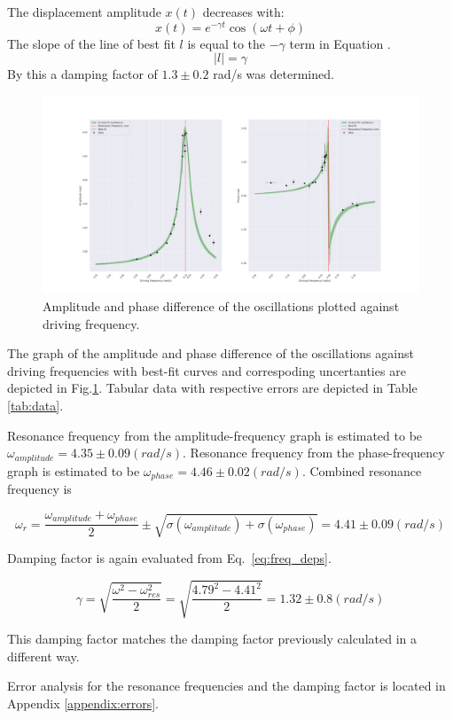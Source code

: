 The displacement amplitude $x(t)$ decreases with:
\begin{equation}
  x(t) = e^{-\gamma t} \cos(\omega t + \phi) 
\end{equation}
The slope of the line of best fit $l$ is equal to the $-\gamma$ term in Equation .
\begin{equation}
  |l| = \gamma 
\end{equation}
By this a damping factor of $1.3 ± 0.2$ rad/s was determined.



\begin{figure}[H]
  \centering
  \includegraphics[width=1\textwidth]{oscillations/images/resonance}
  \caption{Amplitude and phase difference of the oscillations plotted against driving frequency.}
  \label{fig:resonance}
\end{figure}

The graph of the amplitude and phase difference of the oscillations against driving frequencies with best-fit curves and correspoding uncertanties are depicted in Fig.\ref{fig:resonance}. Tabular data with respective errors are depicted in Table \ref{tab:data}.

Resonance frequency from the amplitude-frequency graph is estimated to be $\omega_{amplitude} = 4.35 \pm 0.09 (rad/s)$. Resonance frequency from the phase-frequency graph is estimated to be $\omega_{phase} = 4.46 \pm 0.02 (rad/s)$. Combined resonance frequency is

\begin{equation*}
\omega_{r} = \frac{\omega_{amplitude} + \omega_{phase}}{2} \pm \sqrt{\sigma(\omega_{amplitude}) + \sigma(\omega_{phase})} = 4.41 \pm 0.09 (rad/s)
\end{equation*}

Damping factor is again evaluated from Eq.~\ref{eq:freq_deps}.

\begin{equation*}
        \gamma = \sqrt{ \frac{\omega^2 - \omega_{res}^2}{2} } = \sqrt{ \frac{4.79^2 - 4.41^2}{2} } = 1.32 \pm 0.8 (rad/s)
\end{equation*}       

This damping factor matches the damping factor previously calculated in a different way.

Error analysis for the resonance frequencies and the damping factor is located in Appendix \ref{appendix:errors}.
